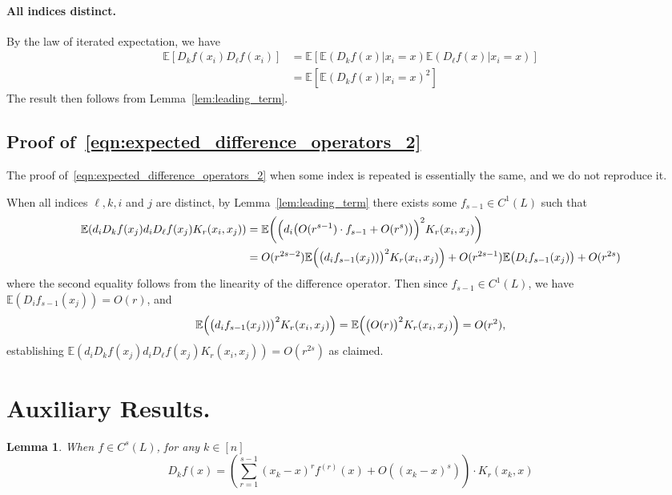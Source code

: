 \documentclass{article}
\newcommand{\1}{\mathbf{1}}
\newcommand{\Ebb}{\mathbb{E}}
\theoremstyle{alden}
\theoremstyle{aldenthm}
\newtheorem{lemma}{Lemma}
\theoremstyle{definition}
\theoremstyle{remark}
\begin{document}
\paragraph{All indices distinct.}

By the law of iterated expectation, we have
\begin{align}
\Ebb\left[D_kf(x_i)D_{\ell}f(x_i)\right] & = \Ebb\left[\Ebb\left(D_kf(x)|x_i = x\right) \Ebb\left(D_{\ell}f(x)|x_i = x\right)\right] \nonumber \\
& = \Ebb\left[\Ebb\left(D_kf(x)|x_i = x\right)^2\right] \label{eqn:expected_difference_operators_pf1}
\end{align}
The result then follows from Lemma~\ref{lem:leading_term}.

\subsection{Proof of~\eqref{eqn:expected_difference_operators_2}}

The proof of~\eqref{eqn:expected_difference_operators_2} when some index is repeated is essentially the same, and we do not reproduce it.

When all indices $\ell,k,i$ and $j$ are distinct, by Lemma~\ref{lem:leading_term} there exists some $f_{s-1} \in C^1(L)$ such that
\begin{align*}
\Ebb(d_iD_kf(x_j)d_iD_{\ell}f(x_j)K_r(x_i,x_j)) & = \Ebb\biggl(\Bigl(d_i\bigl(O(r^{s-1})\cdot f_{s - 1} + O(r^s)\bigr)\Bigr)^2K_r(x_i,x_j)\biggr) \\
& = O(r^{2s - 2})\Ebb\Bigl(\bigl(d_if_{s-1}(x_j))\bigr)^2K_{r}(x_i,x_j)\Bigr) + O(r^{2s - 1})\Ebb\bigl(D_if_{s - 1}(x_j)\bigr)+ O(r^{2s})
\end{align*}
where the second equality follows from the linearity of the difference operator. Then since $f_{s-1} \in C^1(L)$, we have $\Ebb(D_if_{s-1}(x_j)) = O(r)$, and
\begin{equation*}
\Ebb\Bigl(\bigl(d_if_{s-1}(x_j))\bigr)^2K_{r}(x_i,x_j)\Bigr) = \Ebb\Bigl(\bigl(O(r)\bigr)^2K_{r}(x_i,x_j)\Bigr) = O(r^2),
\end{equation*}
establishing $\Ebb(d_iD_kf(x_j)d_iD_{\ell}f(x_j)K_r(x_i,x_j)) = O(r^{2s})$ as claimed.

\section{Auxiliary Results.}
\begin{lemma}
	\label{lem:difference_operator_taylor}
	When $f \in C^s(L)$, for any $k \in [n]$ 
	\begin{equation*}
	D_kf(x) = \left(\sum_{r = 1}^{s - 1} (x_k - x)^r f^{(r)}(x) + O((x_k - x)^{s})\right) \cdot K_r(x_k,x)
	\end{equation*}
\end{lemma}
\end{document}

